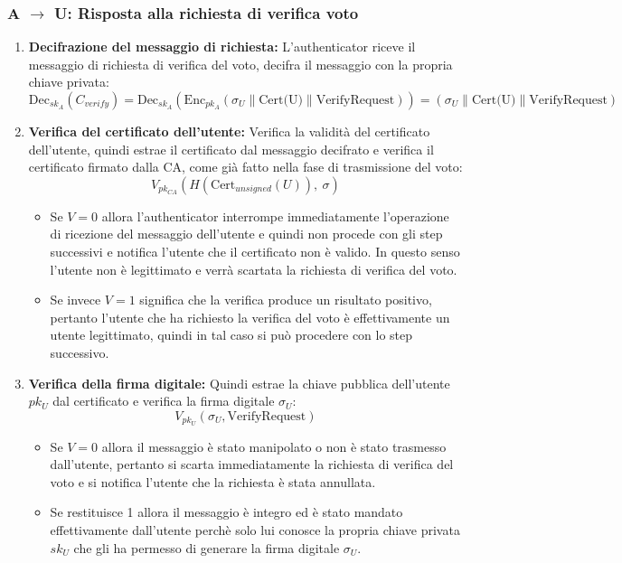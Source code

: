 \subsubsection{A $\to$ U: Risposta alla richiesta di verifica voto}
\begin{enumerate}
	\item \textbf{Decifrazione del messaggio di richiesta:}
	L'authenticator riceve il messaggio di richiesta di verifica del voto, decifra il messaggio con la propria chiave privata:
	$$ \text{Dec}_{sk_A}(C_{verify}) = \text{Dec}_{sk_A}(\text{Enc}_{pk_A}(\sigma_{U} \| \text{Cert(U)} \| \text{VerifyRequest})) = \boxed{(\sigma_{U} \| \text{Cert(U)} \| \text{VerifyRequest})} $$
	
	\item \textbf{Verifica del certificato dell'utente:}
	Verifica la validità del certificato dell'utente, quindi estrae il certificato dal messaggio decifrato e verifica il certificato firmato dalla CA, come già fatto nella fase di trasmissione del voto:
	$$ V_{pk_{CA}}(H(\text{Cert}_{unsigned}(U)),\ \sigma) $$
	\begin{itemize}
		\item Se $V=0$ allora l'authenticator interrompe immediatamente l'operazione di ricezione del messaggio dell'utente e quindi non procede con gli step successivi e notifica l'utente che il certificato non è valido. In questo senso l'utente non è legittimato e verrà scartata la richiesta di verifica del voto.
		
		\item Se invece $V=1$ significa che la verifica produce un risultato positivo, pertanto l'utente che ha richiesto la verifica del voto è effettivamente un utente legittimato, quindi in tal caso si può procedere con lo step successivo.
	\end{itemize}

	\item \textbf{Verifica della firma digitale:}
	Quindi estrae la chiave pubblica dell'utente $pk_U$ dal certificato e verifica la firma digitale $\sigma_{U}$:
	$$ V_{pk_U}(\sigma_{U}, \text{VerifyRequest}) $$
	\begin{itemize}
		\item Se $V=0$ allora il messaggio è stato manipolato o non è stato trasmesso dall'utente, pertanto si scarta immediatamente la richiesta di verifica del voto e si notifica l'utente che la richiesta è stata annullata.
		
		\item Se restituisce 1 allora il messaggio è integro ed è stato mandato effettivamente dall'utente perchè solo lui conosce la propria chiave privata $sk_U$ che gli ha permesso di generare la firma digitale $\sigma_{U}$.
	\end{itemize}


\end{enumerate}
